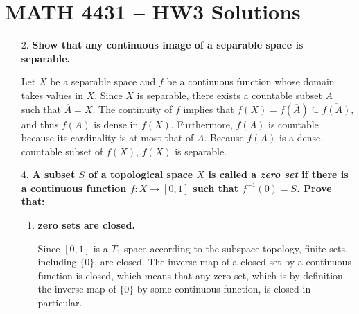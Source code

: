 \documentclass[a4paper,12pt]{article}
\begin{document}
\section*{MATH 4431 -- HW3 Solutions}
\begin{enumerate}
    \item[2.]
        \boldmath\textbf{Show that any continuous image of a separable space is separable.
        }\unboldmath \par
        Let $X$ be a separable space and $f$ be a continuous function whose domain takes values in $X$. Since $X$ is separable, there exists a countable subset $A$ such that $\overline{A} = X$. The continuity of $f$ implies that $f(X) = f(\overline{A}) \subseteq \overline{f(A)}$, and thus $f(A)$ is dense in $f(X)$. Furthermore, $f(A)$ is countable because its cardinality is at most that of $A$. Because $f(A)$ is a dense, countable subset of $f(X)$, $f(X)$ is separable.

    \item[4.]
        \boldmath\textbf{A subset $S$ of a topological space $X$ is called a \emph{zero set} if there is a continuous function $f : X \to [0, 1]$ such that $f^{-1}(0) = S$. Prove that:
        }\unboldmath \par
        \begin{enumerate}
            \item
                \boldmath\textbf{zero sets are closed.
                }\unboldmath \par
                Since $[0, 1]$ is a $T_1$ space according to the subspace topology, finite sets, including $\{0\}$, are closed. The inverse map of a closed set by a continuous function is closed, which means that any zero set, which is by definition the inverse map of $\{0\}$ by some continuous function, is closed in particular.


\end{enumerate}
\end{enumerate}
\end{document}
